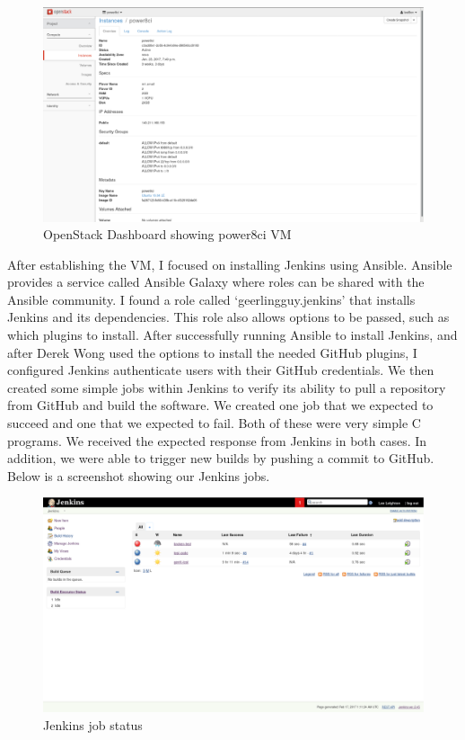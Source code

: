 \documentclass[10pt,onecolumn,journal,draftclsnofoot]{IEEEtran}
\begin{document}
\begin{figure}[H]
  \centering
  \includegraphics[width=\textwidth, keepaspectratio]{openstack.eps}
  \caption{OpenStack Dashboard showing power8ci VM}
\end{figure}

After establishing the VM, I focused on installing Jenkins using Ansible.
Ansible provides a service called Ansible Galaxy where roles can be shared with the Ansible community.
I found a role called `geerlingguy.jenkins' that installs Jenkins and its dependencies.
This role also allows options to be passed, such as which plugins to install.
After successfully running Ansible to install Jenkins, and after Derek Wong used the options to install the needed GitHub plugins,
I configured Jenkins authenticate users with their GitHub credentials.
We then created some simple jobs within Jenkins to verify its ability to pull a repository from GitHub and build the software.
We created one job that we expected to succeed and one that we expected to fail.
Both of these were very simple C programs.
We received the expected response from Jenkins in both cases.
In addition, we were able to trigger new builds by pushing a commit to GitHub.
Below is a screenshot showing our Jenkins jobs.
\begin{figure}[H]
  \centering
  \includegraphics[width=\textwidth, keepaspectratio]{jenkins.eps}
  \caption{Jenkins job status}
\end{figure}
\end{document}
